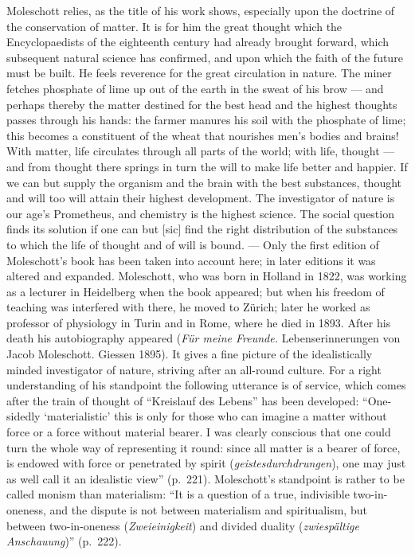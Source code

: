\documentclass[12pt,a4paper]{book}
\newcommand{\opage}[1]{\marginnote{\footnotesize\textit{[#1]}}}
\begin{document}
Moleschott relies, as the title of his work shows, especially upon the doctrine
of the conservation of matter. It is for him the great thought which the
Encyclopaedists of the eighteenth century had already brought forward, which
subsequent natural science has confirmed, and upon which the faith of the future
must be built. He feels reverence for the great circulation in nature. The miner
fetches phosphate of lime up out of the earth in the sweat of his brow --- and
perhaps thereby the matter destined for the best head and the highest thoughts
passes through \opage{503}his hands: the farmer manures his soil with the phosphate of
lime; this becomes a constituent of the wheat that nourishes men's bodies and
brains! With matter, life circulates through all parts of the world; with life,
thought --- and from thought there springs in turn the will to make life better
and happier. If we can but supply the organism and the brain with the best
substances, thought and will too will attain their highest development. The
investigator of nature is our age's Prometheus, and chemistry is the highest
science. The social question finds its solution if one can but [sic] find the
right distribution of the substances to which the life of thought and of will is
bound. --- Only the first edition of Moleschott's book has been taken into
account here; in later editions it was altered and expanded. Moleschott, who was
born in Holland in 1822, was working as a lecturer in Heidelberg when the book
appeared; but when his freedom of teaching was interfered with there, he moved
to Zürich; later he worked as professor of physiology in Turin and in Rome,
where he died in 1893. After his death his autobiography appeared
(\textit{Für meine Freunde.} Lebenserinnerungen von Jacob Moleschott. Giessen
1895). It gives a fine picture of the idealistically minded investigator of
nature, striving after an all-round culture. For a right understanding of his
standpoint the following utterance is of service, which comes after the train of
thought of ``Kreislauf des Lebens'' has been developed: ``One-sidedly
`materialistic' this is only for those who can imagine a matter without force or
a force without material bearer. I was clearly conscious that one could turn the
whole way of representing it round: since all matter is a bearer of force, is
endowed with force or penetrated by spirit (\textit{geistesdurchdrungen}), one
may just as well call it an idealistic view'' (p.~221). Moleschott's standpoint
is rather to be called monism than materialism: ``It is a question of a true,
indivisible two-in-oneness, and the dispute is not between materialism and
spiritualism, but between two-in-oneness (\textit{Zweieinigkeit}) and divided
duality (\textit{zwiespältige Anschauung})'' (p.~222).
\end{document}
